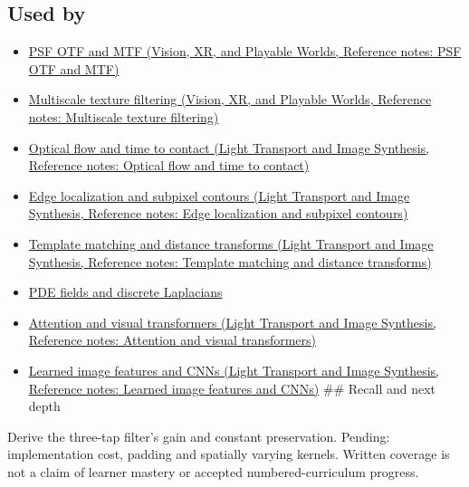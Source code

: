 \subsection{Used by}\label{appendix-d5b3c692d9f0-used-by}

\hypertarget{appendix-d5b3c692d9f0-used-by}{}

\begin{itemize}
\item
  \href{../07-Vision-XR-and-Playable-Worlds/main.pdf\#nameddest=appendix-8b76b0efd27f}{PSF OTF and MTF (Vision, XR, and Playable Worlds, Reference notes: PSF OTF and MTF)}
\item
  \href{../07-Vision-XR-and-Playable-Worlds/main.pdf\#nameddest=appendix-b677a85ba76f}{Multiscale texture filtering (Vision, XR, and Playable Worlds, Reference notes: Multiscale texture filtering)}
\item
  \href{../04-Light-Transport-and-Image-Synthesis/main.pdf\#nameddest=appendix-e2e73f8cd93e}{Optical flow and time to contact (Light Transport and Image Synthesis, Reference notes: Optical flow and time to contact)}
\item
  \href{../04-Light-Transport-and-Image-Synthesis/main.pdf\#nameddest=appendix-36022286b03e}{Edge localization and subpixel contours (Light Transport and Image Synthesis, Reference notes: Edge localization and subpixel contours)}
\item
  \href{../04-Light-Transport-and-Image-Synthesis/main.pdf\#nameddest=appendix-5fb4af80d1c7}{Template matching and distance transforms (Light Transport and Image Synthesis, Reference notes: Template matching and distance transforms)}
\item
  \hyperref[appendix-1988d465c119]{PDE fields and discrete Laplacians}
\item
  \href{../04-Light-Transport-and-Image-Synthesis/main.pdf\#nameddest=appendix-a9d5dfdd164a}{Attention and visual transformers (Light Transport and Image Synthesis, Reference notes: Attention and visual transformers)}
\item
  \href{../04-Light-Transport-and-Image-Synthesis/main.pdf\#nameddest=appendix-47c51ea026fb}{Learned image features and CNNs (Light Transport and Image Synthesis, Reference notes: Learned image features and CNNs)} \#\# Recall and next depth
\end{itemize}

Derive the three-tap filter's gain and constant preservation. Pending: implementation cost, padding and spatially varying kernels. Written coverage is not a claim of learner mastery or accepted numbered-curriculum progress.

